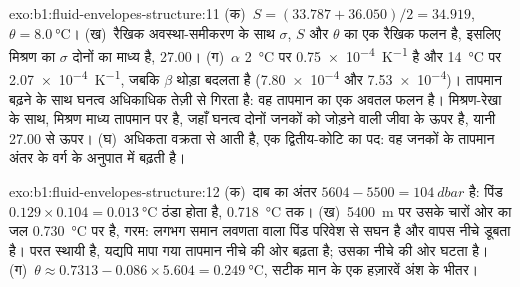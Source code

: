 \begin{solution}{exo:b1:fluid-envelopes-structure:11}
(क)~$S = (33.787 + 36.050)/2 = 34.919$, $\theta = \qty{8.0}{\celsius}$। (ख)~रैखिक अवस्था-समीकरण के साथ $\sigma$, $S$ और $\theta$ का एक रैखिक फलन है, इसलिए मिश्रण का $\sigma$ दोनों का माध्य है, 27.00। (ग)~$\alpha$ \qty{2}{\celsius} पर \qty{0.75e-4}{K^{-1}} है और \qty{14}{\celsius} पर \qty{2.07e-4}{K^{-1}}, जबकि $\beta$ थोड़ा बदलता है (\num{7.80e-4} और \num{7.53e-4})। तापमान बढ़ने के साथ घनत्व अधिकाधिक तेज़ी से गिरता है: वह तापमान का एक अवतल फलन है। मिश्रण-रेखा के साथ, मिश्रण माध्य तापमान पर है, जहाँ घनत्व दोनों जनकों को जोड़ने वाली जीवा के ऊपर है, यानी 27.00 से ऊपर। (घ)~अधिकता वक्रता से आती है, एक द्वितीय-कोटि का पद: वह जनकों के तापमान अंतर के वर्ग के अनुपात में बढ़ती है।
\end{solution}

\begin{solution}{exo:b1:fluid-envelopes-structure:12}
(क)~दाब का अंतर $5604 - 5500 = \qty{104}{dbar}$ है: पिंड $0.129 \times 0.104 = \qty{0.013}{\celsius}$ ठंडा होता है, \qty{0.718}{\celsius} तक। (ख)~\qty{5400}{m} पर उसके चारों ओर का जल \qty{0.730}{\celsius} पर है, गरम: लगभग समान लवणता वाला पिंड परिवेश से सघन है और वापस नीचे डूबता है। परत स्थायी है, यद्यपि मापा गया तापमान नीचे की ओर बढ़ता है; उसका  नीचे की ओर घटता है। (ग)~$\theta \approx
0.7313 - 0.086 \times 5.604 = \qty{0.249}{\celsius}$, सटीक मान के एक हज़ारवें अंश के भीतर।
\end{solution}

